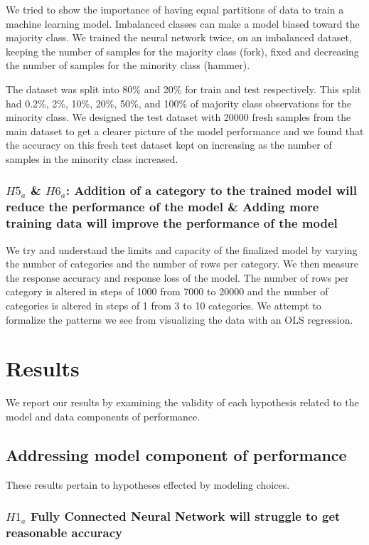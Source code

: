 \documentclass[11pt]{article}
\begin{document}
We tried to show the importance of having equal partitions of data to train
a machine learning model. Imbalanced classes can make a model biased toward
the majority class. We trained the neural network twice, on an imbalanced
dataset, keeping the number of samples for the majority class (fork), fixed
and decreasing the number of samples for the minority class (hammer).

The dataset was split into 80\% and 20\% for train and test respectively.
This split had 0.2\%, 2\%, 10\%, 20\%, 50\%, and 100\% of majority class
observations for the minority class. We designed the test dataset with 20000
fresh samples from the main dataset to get a clearer picture of the model
performance and we found that the accuracy on this fresh test dataset kept
on increasing as the number of samples in the minority class increased.

\subsubsection{$H5_a$ \& $H6_a$: Addition of a category to the trained model will reduce the performance of the model \& Adding more training data will improve the performance of the model}

We try and understand the limits and capacity of the finalized model by
varying the number of categories and the number of rows per category. We
then measure the response accuracy and response loss of the model. The
number of rows per category is altered in steps of 1000 from 7000 to
20000 and the number of categories is altered in steps of 1 from 3 to 10
categories. We attempt to formalize the patterns we see from visualizing
the data with an OLS regression.

\section{Results}

We report our results by examining the validity of each hypothesis
related to the model and data components of performance.

\subsection{Addressing model component of performance}

These results pertain to hypotheses effected by modeling choices.

\subsubsection{$H1_a$\: Fully Connected Neural Network will struggle to
  get reasonable accuracy}
\end{document}
